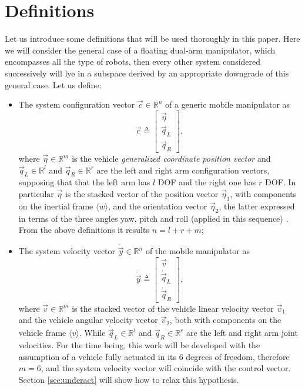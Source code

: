 \section{Definitions}
Let us introduce some definitions that will be used thoroughly in this paper. Here we will consider the general case of a floating dual-arm manipulator, which encompasses all the type of robots, then every other system considered successively will lye in a subspace derived by an appropriate downgrade of this general case. Let us define:
\begin{itemize}
	\item The system configuration vector $\vec{c} \in \mathbb{R}^n$ of a generic mobile manipulator as%
%
	\begin{equation}
	\vec{c} \triangleq  \begin{bmatrix}
						\vec{\eta} \\
						\vec{q}_L \\
						\vec{q}_R
						\end{bmatrix},
	\end{equation}%
	where $\vec{\eta} \in \mathbb{R}^m$ is the vehicle \emph{generalized coordinate position vector} and $\vec{q}_L \in \mathbb{R}^{l}$ and $\vec{q}_R \in \mathbb{R}^{r}$ are the left and right arm configuration vectors, supposing that that the left arm has $l$ DOF and the right one has $r$ DOF. In particular $\vec{\eta}$ is the stacked vector of the position vector $\vec{\eta}_1$, with components on the inertial frame $\langle w \rangle$, and the orientation vector $\vec{\eta}_2$, the latter expressed in terms of the three angles yaw, pitch and roll (applied in this sequence) \cite{Perez2007}. From the above definitions it results $n = l + r + m$;
	\item The system velocity vector $\dot{\vec{y}} \in \mathbb{R}^n$ of the mobile manipulator as%
%
	\begin{equation}
	\dot{\vec{y}} \triangleq \begin{bmatrix}
							 \vec{v} \\
							 \dot{\vec{q}}_L \\
							 \dot{\vec{q}}_R
							 \end{bmatrix},
	\end{equation}%
	 where $\vec{v} \in \mathbb{R}^{m}$ is the stacked vector of the vehicle linear velocity vector $\vec{v}_1$ and the vehicle angular velocity vector $\vec{v}_2$, both with components on the vehicle frame $\langle v \rangle$. While  $\dot{\vec{q}}_L \in \mathbb{R}^{l}$ and $\dot{\vec{q}}_R \in \mathbb{R}^{r}$ are the left and right arm joint velocities. For the time being, this work will be developed with the assumption of a vehicle fully actuated in its 6 degrees of freedom, therefore $m=6$, and the system velocity vector will coincide with the control vector. Section \ref{sec:underact} will show how to relax this hypothesis.
\end{itemize}

